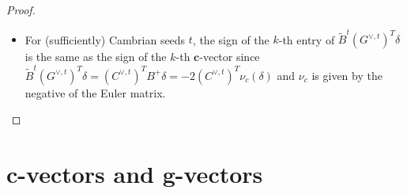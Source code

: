 \documentclass{amsart}
\numberwithin{theorem}{section}
\newcommand{\bfc}{{\boldsymbol{c}}}
\newcommand{\bfg}{{\boldsymbol{g}}}
\begin{document}
\begin{proof}
\begin{itemize}
\begin{itemize}
            \emph{proof}: Since $A^t:=(C^{\vee,t})^T A_0 C^t$ then $G^t A^t (G^{\vee,t})^T:=A_0$. Since $G^t $ is invertible $A_0\cdot \delta = 0$ implies $A^t (G^{\vee,t})^T \cdot \delta = 0$ i.e. $(G^{\vee,t})^T \cdot \delta$ spans the kernel of $A^t$. After sufficiently many coxeter all the g-vectors at $t$ are on the positive side of $\delta^\perp$ and the result follows.
          \item for $t'$ connected to $t$ by mutation in direction $k$, we want $\eta_k^{\widetilde B^t}(\widetilde B^t\cdot\kappa_t)=\widetilde B^{t'}\cdot\kappa_{t'}$
          \item $\eta_k^{\widetilde B^t}(\widetilde B^t\cdot\kappa_t)=\widetilde E^t_{k,\varepsilon}\widetilde B^t\cdot\kappa_t=\widetilde E^t_{k,\varepsilon}\widetilde B^t F^t_{k,\varepsilon} F^t_{k,\varepsilon}\cdot\kappa_t = \widetilde B^{t'} \cdot F^t_{k,\varepsilon} \kappa_t $ but $\kappa_{t'}= F^t_{k,\varepsilon_{trop}} \kappa_t$
          \item For Cambrian mutations, $\varepsilon_{trop}$ is always positive.
            This follows from the explicit formula for $\bfc$-vectors in \cite{cambrian_frameworks} after Prop. 5.4.
          \item The $k$-th row of $F^t_{k,+}+F^t_{k,-}$ is the negative of the $k$-th row of the associated Cartan companion (not quasi)
          \item The $k$-th row of $F^t_{k,-}-F^t_{k,+}$ is the $k$-th row of $\widetilde B^t$
          \item The $k$-th entries of $\widetilde B^{t'} \cdot F^t_{k,\varepsilon} \kappa_t$ and $\widetilde B^{t'} \cdot \kappa_{t'}$ are the same
          \item $A^t:=(C^{\vee,t})^T A_0 C^t$
          \item $A^{t'}=(F^{t,\vee}_{k,\varepsilon_{trop}})^T A_t F^t_{k,\varepsilon_{trop}}$
        \end{itemize}
      \item For (sufficiently) Cambrian seeds $t$, the sign of the $k$-th entry of $\widetilde B^t (G^{\vee,t})^T \delta$ is the same as the sign of the $k$-th $\bfc$-vector since $\widetilde B^t (G^{\vee,t})^T \delta=(C^{\vee,t})^T B^+ \delta = -2 (C^{\vee,t})^T \nu_c(\delta)$ and $\nu_c$ is given by the negative of the Euler matrix.
    \end{itemize}

  \end{proof}

  \section{$\bfc$-vectors and $\bfg$-vectors}
\end{document}
